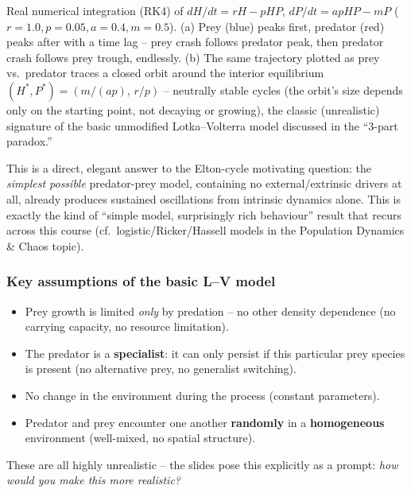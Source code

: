 \documentclass[11pt,a4paper]{article}
\begin{document}
\begin{figbox}[title={Lotka--Volterra predator--prey dynamics: time series and phase portrait}]
\vspace{1mm}
\footnotesize Real numerical integration (RK4) of $dH/dt = rH - pHP$, $dP/dt = apHP - mP$ ($r{=}1.0, p{=}0.05, a{=}0.4, m{=}0.5$). (a) Prey (blue) peaks first, predator (red) peaks after with a time lag -- prey crash follows predator peak, then predator crash follows prey trough, endlessly. (b) The same trajectory plotted as prey vs.\ predator traces a closed orbit around the interior equilibrium $(H^*,P^*)=(m/(ap),\,r/p)$ -- neutrally stable cycles (the orbit's size depends only on the starting point, not decaying or growing), the classic (unrealistic) signature of the basic unmodified Lotka--Volterra model discussed in the ``3-part paradox.''
\end{figbox}

\begin{exambox}
This is a direct, elegant answer to the Elton-cycle motivating question: the \emph{simplest possible} predator-prey model, containing no external/extrinsic drivers at all, already produces sustained oscillations from intrinsic dynamics alone. This is exactly the kind of ``simple model, surprisingly rich behaviour'' result that recurs across this course (cf.\ logistic/Ricker/Hassell models in the Population Dynamics \& Chaos topic).
\end{exambox}

\subsubsection*{Key assumptions of the basic L--V model}
\begin{itemize}[leftmargin=*]
\item Prey growth is limited \emph{only} by predation -- no other density dependence (no carrying capacity, no resource limitation).
\item The predator is a \textbf{specialist}: it can only persist if this particular prey species is present (no alternative prey, no generalist switching).
\item No change in the environment during the process (constant parameters).
\item Predator and prey encounter one another \textbf{randomly} in a \textbf{homogeneous} environment (well-mixed, no spatial structure).
\end{itemize}
These are all highly unrealistic -- the slides pose this explicitly as a prompt: \emph{how would you make this more realistic?}
\end{document}
